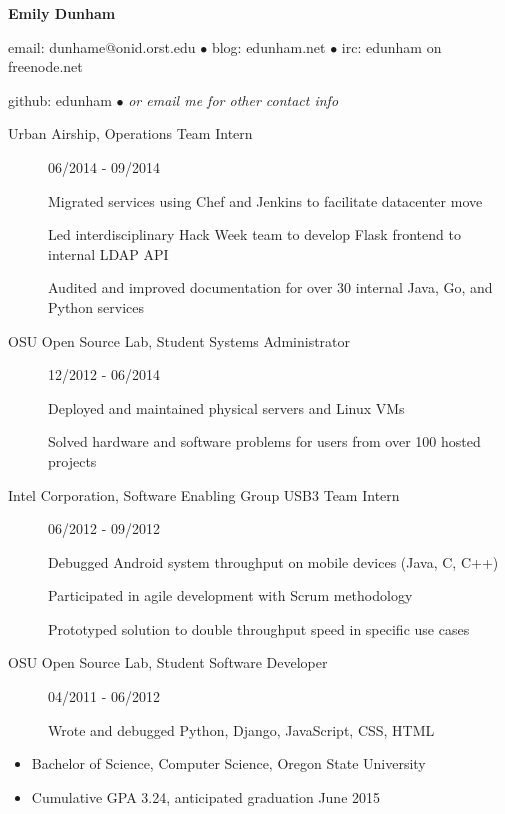 \documentclass[11pt]{article}
\newcommand{\heading}[1]{\uline{\makebox[\textwidth][s]{\Large \bf #1 \hfill}}}
\begin{document}
\centerline{{\LARGE \bf Emily Dunham}}

\bigskip

\centerline{email: dunhame@onid.orst.edu
        $\bullet$
        blog: edunham.net
        $\bullet$
        irc: edunham on freenode.net}
\centerline{github: edunham
        $\bullet$
        \emph{or email me for other contact info}}

\bigskip

\heading{Employment}

\begin{description}
\item[Urban Airship, Operations Team Intern]
    \hfill 06/2014 - 09/2014
    
    Migrated services using Chef and Jenkins to facilitate datacenter move

    Led interdisciplinary Hack Week team to develop Flask frontend to internal LDAP API

    Audited and improved documentation for over 30 internal Java, Go, and Python
    services

\item[OSU Open Source Lab, Student Systems Administrator]
    \hfill 12/2012 - 06/2014

    Deployed and maintained physical servers and Linux VMs

    Solved hardware and software problems for users from over 100 hosted projects

\item[Intel Corporation, Software Enabling Group USB3 Team Intern]
    \hfill 06/2012 - 09/2012

    Debugged Android system throughput on mobile devices (Java, C, C++)

    Participated in agile development with Scrum methodology

    Prototyped solution to double throughput speed in specific use cases

\item[OSU Open Source Lab, Student Software Developer]
    \hfill 04/2011 - 06/2012

    Wrote and debugged Python, Django, JavaScript, CSS, HTML

\end{description}

\bigskip

\heading{Education}

\begin{itemize}
    \setlength{\itemsep}{1pt}
    \setlength{\parskip}{0pt}
    \setlength{\parsep}{0pt}

    \item Bachelor of Science, Computer Science, Oregon State University
    \item Cumulative GPA 3.24, anticipated graduation June 2015

\end{itemize}
\end{document}
